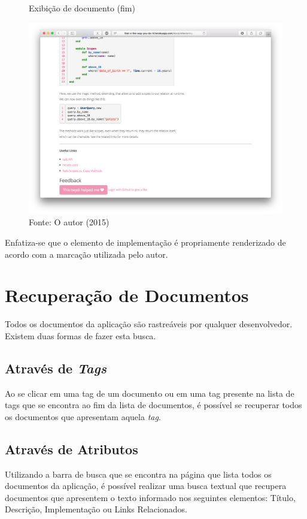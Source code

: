 \begin{figure}[h]
	\centering
    \caption{Exibição de documento (fim)}
    \includegraphics[width=15cm]{Imagens/print-show-3.png}
	\caption*{Fonte: O autor (2015)}
\end{figure}

Enfatiza-se que o elemento de implementação é propriamente renderizado de acordo com a marcação utilizada pelo autor.

\section{Recuperação de Documentos}

Todos os documentos da aplicação são rastreáveis por qualquer desenvolvedor. Existem duas formas de fazer esta busca.

\subsection{Através de \textit{Tags}}

Ao se clicar em uma tag de um documento ou em uma tag presente na lista de tags que se encontra ao fim da lista de documentos, é possível se recuperar todos os documentos que apresentam aquela \textit{tag}.

\subsection{Através de Atributos}

Utilizando a barra de busca que se encontra na página que lista todos os documentos da aplicação, é possível realizar uma busca textual que recupera documentos que apresentem o texto informado nos seguintes elementos: Título, Descrição, Implementação ou Links Relacionados.

